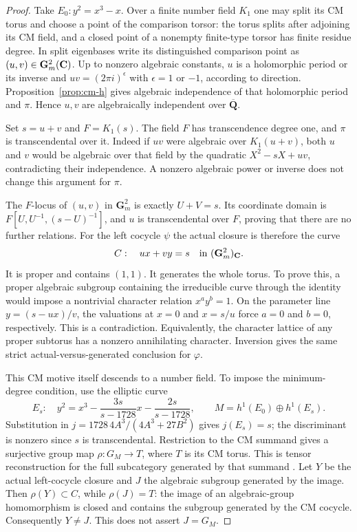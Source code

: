 \documentclass[11pt]{article}
\theoremstyle{definition}\newtheorem{definition}[theorem]{Definition}
\theoremstyle{remark}\newtheorem{remark}[theorem]{Remark}
\newcommand{\Qb}{\overline{\mathbf Q}}\newcommand{\Fp}{\mathbf F_p}
\newcommand{\Gm}{\mathbf G_m}\newcommand{\B}{\mathrm B}\newcommand{\dR}{\mathrm{dR}}
\begin{document}
\begin{proof}
Take $E_0:y^2=x^3-x$. Over a finite number field $K_1$ one may split its CM torus and choose a point of the comparison torsor: the torus splits after adjoining its CM field, and a closed point of a nonempty finite-type torsor has finite residue degree. In split eigenbases write its distinguished comparison point as $(u,v)\in\Gm^2(\C)$. Up to nonzero algebraic constants, $u$ is a holomorphic period or its inverse and $uv=(2\pi i)^{\epsilon}$ with $\epsilon=1$ or $-1$, according to direction. Proposition~\ref{prop:cm-h} gives algebraic independence of that holomorphic period and $\pi$. Hence $u,v$ are algebraically independent over $\Qb$.

Set $s=u+v$ and $F=K_1(s)$. The field $F$ has transcendence degree one, and $\pi$ is transcendental over it. Indeed if $uv$ were algebraic over $K_1(u+v)$, both $u$ and $v$ would be algebraic over that field by the quadratic $X^2-sX+uv$, contradicting their independence. A nonzero algebraic power or inverse does not change this argument for $\pi$.

The $F$-locus of $(u,v)$ in $\Gm^2$ is exactly $U+V=s$. Its coordinate domain is $F[U,U^{-1},(s-U)^{-1}]$, and $u$ is transcendental over $F$, proving that there are no further relations. For the left cocycle $\psi$ the actual closure is therefore the curve
\[
                       C:\quad ux+vy=s
                         \quad\hbox{in }(\Gm^2)_\C.
\]
It is proper and contains $(1,1)$. It generates the whole torus. To prove this, a proper algebraic subgroup containing the irreducible curve through the identity would impose a nontrivial character relation $x^ay^b=1$. On the parameter line $y=(s-ux)/v$, the valuations at $x=0$ and $x=s/u$ force $a=0$ and $b=0$, respectively. This is a contradiction. Equivalently, the character lattice of any proper subtorus has a nonzero annihilating character. Inversion gives the same strict actual-versus-generated conclusion for $\varphi$.

This CM motive itself descends to a number field. To impose the minimum-degree condition, use the elliptic curve
\[
 E_s:\quad y^2=x^3-\frac{3s}{s-1728}x-\frac{2s}{s-1728},
 \qquad M=h^1(E_0)\oplus h^1(E_s).
\]
Substitution in $j=1728\,4A^3/(4A^3+27B^2)$ gives $j(E_s)=s$; the discriminant is nonzero since $s$ is transcendental. Restriction to the CM summand gives a surjective group map $\rho:G_M\to T$, where $T$ is its CM torus. This is tensor reconstruction for the full subcategory generated by that summand \cite[Proposition~2.21(a), p.~26]{DeligneMilne}. Let $Y$ be the actual left-cocycle closure and $J$ the algebraic subgroup generated by the image. Then $\rho(Y)\subset C$, while $\rho(J)=T$: the image of an algebraic-group homomorphism is closed and contains the subgroup generated by the CM cocycle. Consequently $Y\ne J$. This does not assert $J=G_M$.


\end{proof}
\end{document}
